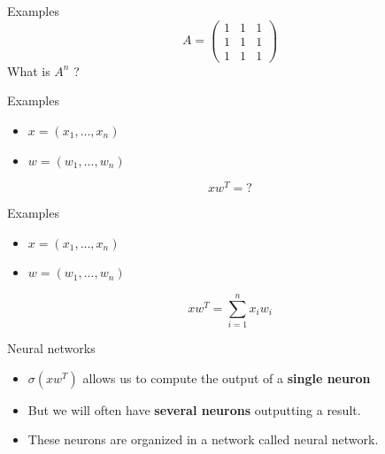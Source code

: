 \documentclass{beamer}
\begin{document}
\begin{frame}{Examples}
   \[A=
\begin{pmatrix}
1 & 1 & 1 \\
1 & 1 & 1 \\
1 & 1 & 1
\end{pmatrix}
\] 
What is $A^n$ ?
\end{frame}


\begin{frame}{Examples}
    \begin{itemize}
        \item $x=(x_1,...,x_n)$
        \item $w=(w_1,...,w_n)$
    \end{itemize}
    \begin{equation}
        xw^T=\text{?}
    \end{equation}
\end{frame}

\begin{frame}{Examples}
    \begin{itemize}
        \item $x=(x_1,...,x_n)$
        \item $w=(w_1,...,w_n)$
    \end{itemize}
    \begin{equation}
    xw^T= \sum^{n}_{i=1} x_iw_i
    \end{equation}
\end{frame}

\begin{frame}{Neural networks}
    \begin{itemize}
        \item $\sigma(xw^T )$ allows us to compute the output of a
            \textbf{{single neuron}} 
        \item But we will often have \textbf{{several neurons}} outputting a
            result.
        \item These neurons are organized in a network called neural network.
    \end{itemize}
\end{frame}
\end{document}
